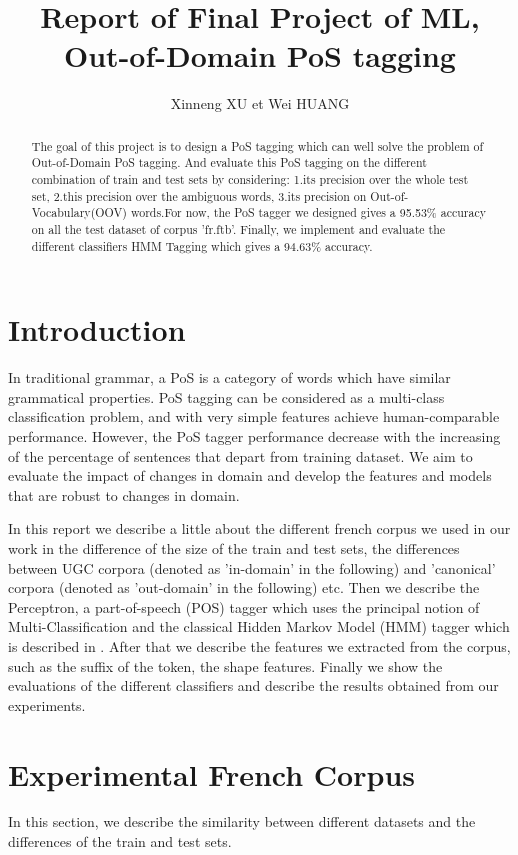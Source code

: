 \documentclass{article}
\title{Report of Final Project of ML, Out-of-Domain PoS tagging}
\author{Xinneng XU et Wei HUANG}
\begin{document}
\maketitle

\begin{abstract}
The goal of this project is to design a PoS tagging which can well solve the problem of Out-of-Domain PoS tagging. And evaluate this PoS tagging on the different combination of train and test sets by considering: 1.its precision over the whole test set, 2.this precision over the ambiguous words, 3.its precision on Out-of-Vocabulary(OOV) words.For now, the PoS tagger we designed gives a 95.53\% accuracy on all the test dataset of corpus 'fr.ftb'. Finally, we implement and evaluate the different classifiers HMM Tagging which gives a 94.63\% accuracy.
\end{abstract}


\section{Introduction}
In traditional grammar, a PoS is a category of words which have similar grammatical properties. PoS tagging can be considered as a multi-class classification problem, and with very simple features achieve human-comparable performance. However, the PoS tagger performance decrease with the increasing of the percentage of sentences that depart from training dataset. We aim to evaluate the impact of changes in domain and develop the features and models that are robust to changes in domain.

In this report we describe a little about the different french corpus we used in our work in the difference of the size of the train and test sets, the differences between UGC corpora (denoted as 'in-domain' in the following) and 'canonical' corpora (denoted as 'out-domain' in the following) etc. Then we describe the Perceptron, a part-of-speech (POS) tagger which uses the principal notion of Multi-Classification and the classical Hidden Markov Model (HMM) tagger which is described in \cite{charniak1993equations}. After that we describe the features we extracted from the corpus, such as the suffix of the token, the shape features. Finally we show the evaluations of the different classifiers and describe the results obtained from our experiments.


\section{Experimental French Corpus}
In this section, we describe the similarity between different datasets and the differences of the train and test sets.
\end{document}
